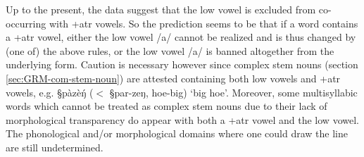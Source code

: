 Up to the present, the data suggest that the low vowel is excluded from
co-occurring with {\sc +atr}  vowels.  So the prediction seems to be that if a
word contains a {\sc +atr} vowel,  either the low vowel {\I /a/} cannot be
realized and is thus changed by (one of) the above rules, or  the  low vowel {\I
/a/} is banned  altogether from the underlying form. Caution is necessary
however since complex stem nouns (section \ref{sec:GRM-com-stem-noun}) are
attested containing both  low vowels and {\sc +atr} vowels, e.g. {\S pàzèŋ́}
($<$ {\S par-zeŋ}, {\sc hoe-big})  `big hoe'. Moreover, some multisyllabic words
which cannot be treated as complex stem nouns due to their lack of morphological
transparency do appear with both  a {\sc +atr} vowel and  the low vowel. The
phonological and/or morphological domains where one could draw the line are
still undetermined.


